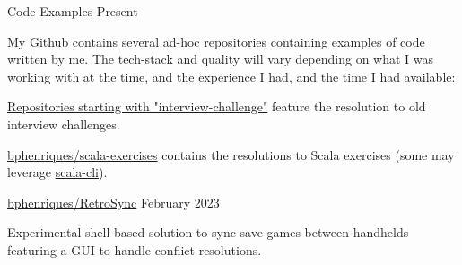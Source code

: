 \begin{cventries}
  \vspace{2mm}

    
\openSourceEntry
    {Code Examples}
    {Present}
    {   
    \begin{openSourceDescription}
    My Github contains several ad-hoc repositories containing examples of code written by me. The tech-stack and quality will vary depending on what I was working with at the time, and the experience I had, and the time I had available:
    \end{openSourceDescription}
    \vspace{8mm}
    \begin{openSourceItems}
        \item \href{https://github.com/bphenriques?tab=repositories&q=interview-challenge&type=&language=&sort=}{Repositories starting with "interview-challenge"} feature the resolution to old interview challenges.
        \item \href{https://github.com/bphenriques/scala-exercises}{bphenriques/scala-exercises} contains the resolutions to Scala exercises (some may leverage \href{https://scala-cli.virtuslab.org/}{scala-cli}).
    \end{openSourceItems}
    \vspace{4mm}
    }

  \vspace{2mm}

\openSourceEntry
    {\href{https://github.com/bphenriques/knowledge-base}{bphenriques/RetroSync}}
    {February 2023}
    {   
    \begin{openSourceDescription}
    Experimental shell-based solution to sync save games between handhelds featuring a GUI to handle conflict resolutions.
    \end{openSourceDescription}
    \vspace{4mm}
    }
    
\end{cventries}
